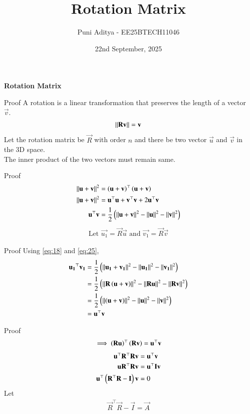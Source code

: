 \documentclass{beamer}
\title{Rotation Matrix}
\date{22nd September, 2025}
\author{Puni Aditya - EE25BTECH11046}
\begin{document}
\frame{\titlepage}
\begin{frame}
\centering
	\textbf{Rotation Matrix}
\end{frame}

\begin{frame}{Proof}
A rotation is a linear transformation that preserves the length of a vector $\vec{v}$.
\begin{align}
    \left\lVert\mathbf{R}\mathbf{v}\right\rVert = \mathbf{v} \label{eq:18}
\end{align}
Let the rotation matrix be $\vec{R}$ with order $n$ and there be two vector $\vec{u}$ and $\vec{v}$ in the 3D space. \\
The inner product of the two vectors must remain same.
\end{frame}

\begin{frame}{Proof}
\begin{align}
    \left\lVert\mathbf{u}+\mathbf{v}\right\rVert^2 &= \left(\mathbf{u}+\mathbf{v}\right)^\top\left(\mathbf{u}+\mathbf{v}\right) \\
    \left\lVert\mathbf{u}+\mathbf{v}\right\rVert^2 &= \mathbf{u}^\top\mathbf{u}+\mathbf{v}^\top\mathbf{v} + 2\mathbf{u}^\top\mathbf{v} \\
    \mathbf{u}^\top\mathbf{v} &= \frac{1}{2}\left(\left\lVert\mathbf{u}+\mathbf{v}\right\rVert^2 - \left\lVert\mathbf{u}\right\rVert^2 - \left\lVert\mathbf{v}\right\rVert^2\right) \label{eq:25}
\end{align}
\begin{align}
    \text{Let }\vec{u_1} = \vec{R}\vec{u}\text{ and }\vec{v_1} = \vec{R}\vec{v}
\end{align}
\end{frame}

\begin{frame}{Proof}
Using \eqref{eq:18} and \eqref{eq:25}, 
\begin{align}
    \mathbf{u_1}^\top\mathbf{v_1} &= \frac{1}{2}\left(\left\lVert\mathbf{u_1}+\mathbf{v_1}\right\rVert^2 - \left\lVert\mathbf{u_1}\right\rVert^2 - \left\lVert\mathbf{v_1}\right\rVert^2\right) \\
    &= \frac{1}{2}\left(\left\lVert\mathbf{R}\left(\mathbf{u}+\mathbf{v}\right)\right\rVert^2 - \left\lVert\mathbf{R}\mathbf{u}\right\rVert^2 - \left\lVert\mathbf{R}\mathbf{v}\right\rVert^2\right) \\
    &= \frac{1}{2}\left(\left\lVert\left(\mathbf{u}+\mathbf{v}\right)\right\rVert^2 - \left\lVert\mathbf{u}\right\rVert^2 - \left\lVert\mathbf{v}\right\rVert^2\right) \\
    &= \mathbf{u}^\top\mathbf{v}
\end{align}
\end{frame}

\begin{frame}{Proof}
\begin{align} 
    \implies \left(\mathbf{R}\mathbf{u}\right)^\top \left(\mathbf{R}\mathbf{v}\right) = \mathbf{u}^\top \mathbf{v}
\end{align}
\begin{align}
    \mathbf{u}^\top\mathbf{R}^\top\mathbf{R}\mathbf{v} &= \mathbf{u}^\top \mathbf{v} \\
    \mathbf{u}\mathbf{R}^\top\mathbf{R}\mathbf{v} &= \mathbf{u}^\top\mathbf{I}\mathbf{v} \\
    \mathbf{u}^\top\left(\mathbf{R}^\top\mathbf{R}-\mathbf{I}\right)\mathbf{v} &= 0 \label{eq:43}
\end{align}
Let
\begin{align*}
    \vec{R}^\top\vec{R}-\vec{I} = \vec{A}
\end{align*}
\end{frame}
\end{document}
